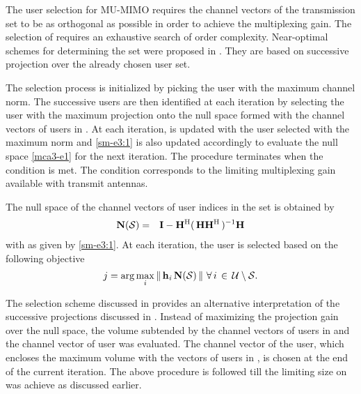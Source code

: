 
The user selection for MU-MIMO requires the channel vectors of the transmission set to be as orthogonal as possible in order to achieve the multiplexing gain. The selection of  requires an exhaustive search of  order complexity. Near-optimal schemes for determining the set  were proposed in \cite{dimic2005downlink,shen2006low,antti_user_selection,sus2006zfbf,zhang2007user}. They are based on successive projection over the already chosen user set.

The selection process is initialized by picking the user with the maximum channel norm. The successive users are then identified at each iteration by selecting the user with the maximum projection onto the null space formed with the channel vectors of users in . At each iteration,  is updated with the user selected with the maximum norm and \eqref{sm-e3:1} is also updated accordingly to evaluate the null space \eqref{mca3-e1} for the next iteration. The procedure terminates when the condition  is met. The condition corresponds to the limiting multiplexing gain available with  transmit antennas.

The null space of the channel vectors of user indices in the set  is obtained by
\begin{eqnarray}
\mbf{N}(\mc{S}) &=& \mbf{I} - \mbf{H}^\mrm{H} ( \, \mbf{H} \mbf{H}^\mrm{H} \, )^{-1} \mbf{H}
\label{mca3-e1}
\end{eqnarray}
with  as given by \eqref{sm-e3:1}. At each iteration, the user  is selected based on the following objective
\begin{equation}
j = \arg \max_i \gnorm{\mvecxy{h}{i} \, \mbf{N}(\mc{S})} \, \fall i \inm \mc{U} \bs \mc{S}.
\label{mca3-e2}
\end{equation}

The selection scheme discussed in \cite{jin2010novel,ko2012determinant} provides an alternative interpretation of the successive projections discussed in \cite{dimic2005downlink,shen2006low,antti_user_selection,sus2006zfbf,zhang2007user}. Instead of maximizing the projection gain over the null space, the volume subtended by the channel vectors of users in  and the channel vector of user  was evaluated. The channel vector of the user, which encloses the maximum volume with the vectors of users in , is chosen at the end of the current iteration. The above procedure is followed till the limiting size on  was achieve as discussed earlier.

